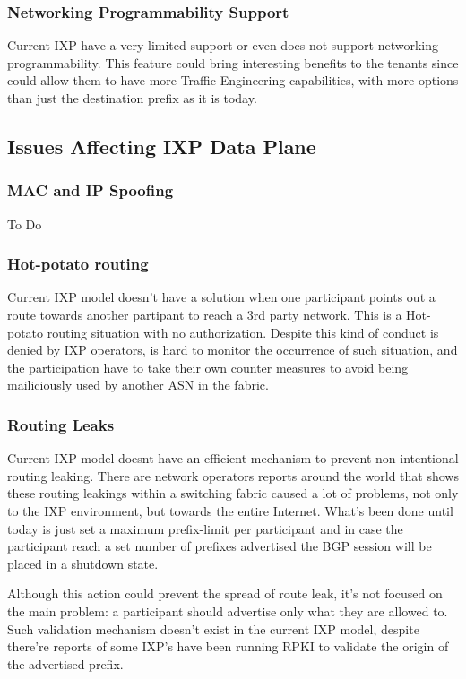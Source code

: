 \documentclass[conference]{IEEEtran/IEEEtran}
\begin{document}
\subsubsection{Networking Programmability Support}
Current IXP have a very limited support or even does not support networking programmability. This feature could bring interesting benefits to the tenants since could allow them to have more Traffic Engineering capabilities, with more options than just the destination prefix as it is today. 

\subsection{Issues Affecting IXP Data Plane}
\subsubsection{MAC and IP Spoofing}
To Do

\subsubsection{Hot-potato routing}
Current IXP model doesn't have a solution when one participant points out a route towards another partipant to reach a 3rd party network. This is a Hot-potato routing situation with no authorization. Despite this kind of conduct is denied by IXP operators, is hard to monitor the occurrence of such situation, and the participation have to take their own counter measures to avoid being mailiciously used by another ASN in the fabric.

\subsubsection{Routing Leaks}
\label{subsub:routingleak}
Current IXP model doesnt have an efficient mechanism to prevent non-intentional routing leaking. There are network operators reports around the world that shows these routing leakings within a switching fabric caused a lot of problems, not only to the IXP environment, but towards the entire Internet. What's been done until today is just set a maximum prefix-limit per participant and in case the participant reach a set number of prefixes advertised the BGP session will be placed in a shutdown state.

Although this action could prevent the spread of route leak, it's not focused on the main problem: a participant should advertise only what they are allowed to. Such validation mechanism doesn't exist in the current IXP model, despite there're reports of some IXP's have been running RPKI to validate the origin of the advertised prefix.
\end{document}
